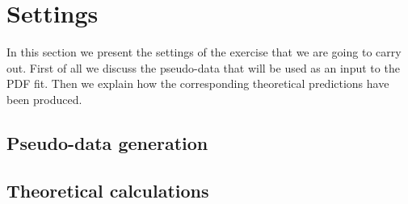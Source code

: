 \section{Settings}
\label{sec:settings}

In this section we present the settings of the exercise that
we are going to carry out.
%
First of all we discuss the pseudo-data that will be used as an input to
the PDF fit.
%
Then we explain how the corresponding theoretical predictions have been produced.

\subsection{Pseudo-data generation}

\begin{itemize}


  
\end{itemize}  


\subsection{Theoretical calculations}
